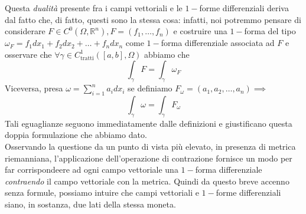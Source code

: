 \begin{remark}
Questa \emph{dualità} presente fra i campi vettoriali e le $1-$forme differenziali deriva dal fatto che, di fatto, questi sono la stessa cosa: infatti,
noi potremmo pensare di considerare $F \in C^0(\Omega, \mathbb{R}^n), F=(f_1, \ldots, f_n)$ e costruire una $1-$forma del tipo $\omega_F=f_1 dx_1 + f_2 dx_2 + \ldots + f_ndx_n$ come $1-$forma differenziale associata ad $F$ e osservare
che $\forall \gamma \in C^1_\text{tratti}([a, b], \Omega)$ abbiamo che
$$
\int_\gamma F = \int_\gamma \omega_F
$$
Viceversa, presa $\omega = \sum\limits_{i=1}^n a_i dx_i$ se definiamo $F_\omega = (a_1, a_2, \ldots, a_n) \implies$
$$
\int_\gamma \omega = \int_\gamma F_\omega
$$
Tali eguaglianze seguono immediatamente dalle definizioni e giustificano questa doppia formulazione che abbiamo dato. \\
Osservando la questione da un punto di vista più elevato, in presenza di metrica riemanniana, l'applicazione dell'operazione di contrazione fornisce un modo per far corrispondeere ad ogni campo vettoriale
una $1-$forma differenziale \emph{contraendo} il campo vettoriale con la metrica. Quindi da questo breve accenno senza formule, possiamo intuire che campi vettoriali e $1-$forme differenziali siano, in sostanza, due lati della stessa moneta.
\end{remark}


